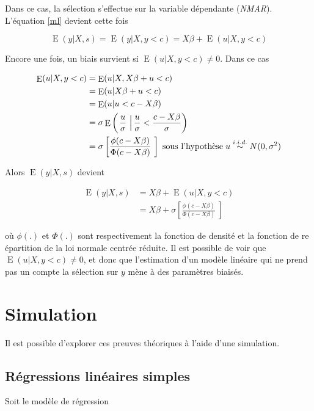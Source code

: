 \documentclass{article}
\DeclareMathOperator{\esp}{E}
\begin{document}
Dans ce cas, la s\'{e}lection s'effectue sur la variable d\'{e}pendante (\textit{NMAR}). L'\'{e}quation \eqref{ml} devient cette fois

\[\esp(y|X,s)=\esp(y|X,y<c)=X\beta+\esp(u|X,y<c)\]

Encore une fois, un biais survient si $\esp(u|X,y<c)\neq0$. Dans ce cas

\begin{align}
\esp(u|X,y<c) & = \esp(u|X,X\beta+u<c) \nonumber \\
 & = \esp(u|X\beta+u<c) \nonumber \\
 & = \esp(u|u<c-X\beta) \nonumber \\
 & = \sigma\esp\left(\left. \frac{u}{\sigma}\  \right\rvert \frac{u}{\sigma}< \frac{c-X\beta}{\sigma} \right)  \nonumber \\
  & = \sigma\left[ \frac{\phi(c-X\beta)}{\Phi(c-X\beta)}\ \right] \hspace{0.1cm}  \text{sous l'hypoth\`{e}se} \hspace{0.1cm} u\overset{i.i.d.}{\sim} N(0,\sigma^2) \nonumber
\end{align}

Alors $\esp(y|X,s)$ devient

\begin{align}
\esp(y|X,s) & =X\beta+\esp(u|X,y<c) \nonumber \\
& = X\beta+\sigma\left[ \frac{\phi(c-X\beta)}{\Phi(c-X\beta)}\ \right] \nonumber
\end{align}

o\`{u} $\phi(.)$ et $\Phi(.)$ sont respectivement la fonction de densit\'{e} et la fonction de re
\'{e}partition de la loi normale centr\'{e}e r\'{e}duite. Il est possible de voir que $\esp(u|X,y<c)\neq0$, et donc que l'estimation d'un mod\`{e}le lin\'{e}aire qui ne prend pas un compte la s\'{e}lection sur $y$ m\`{e}ne \`{a} des param\`{e}tres biais\'{e}s.




\section{Simulation}
Il est possible d'explorer ces preuves th\'{e}oriques \`{a} l'aide d'une simulation. 

\subsection{R\'{e}gressions lin\'{e}aires simples}
Soit le mod\`{e}le de r\'{e}gression
\end{document}
